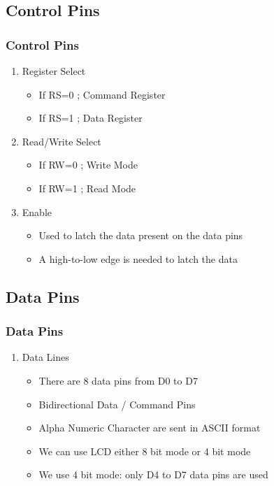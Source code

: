\documentclass[10pt,red]{beamer}
\begin{document}
\subsection{Control Pins}
	\begin{frame}
		\frametitle{Control Pins} \pause
			\begin{enumerate}
				\item <+-|alert@+> Register Select
				\begin{itemize}
					\item <+-|alert@+> If \color{red!80}RS=0\color{black} ; Command Register
					\item <+-|alert@+> If \color{red!80}RS=1\color{black} ; Data Register
				\end{itemize}
				\item <+-|alert@+> Read/Write Select
				\begin{itemize}
					\item <+-|alert@+> If \color{red!80}RW=0\color{black} ; Write Mode
					\item <+-|alert@+> If \color{red!80}RW=1\color{black} ; Read Mode
				\end{itemize}
				\item <+-|alert@+> Enable
				\begin{itemize}
					\item <+-|alert@+> Used to latch the data present on the data pins
					\item <+-|alert@+> A high-to-low edge is needed to latch the data
				\end{itemize}
			\end{enumerate}
	\end{frame}
	
\subsection{Data Pins}
\begin{frame}
		\frametitle{Data Pins} \pause
			\begin{enumerate}[$\checkmark$]
			\item <+-|alert@+> Data Lines
				\begin{itemize}
					\item <+-|alert@+> There are 8 data pins from D0 to D7  \\[8pt]
					\item <+-|alert@+> Bidirectional Data / Command Pins \\[8pt]
					\item <+-|alert@+> Alpha Numeric Character  are sent in ASCII format \\[8pt]
					\item <+-|alert@+> We can use LCD either 8 bit mode or 4 bit mode \\[8pt]
					\item <+-|alert@+> We use 4 bit mode: only D4 to D7 data pins are used  \\[8pt]	
				\end{itemize}
			\end{enumerate}
	\end{frame}
\end{document}
